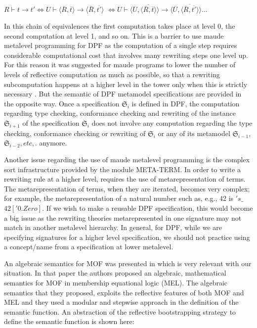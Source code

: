 \documentclass{eceasst}
\begin{document}
\begin{center}
$R \vdash t \rightarrow t' \Leftrightarrow U \vdash \langle \overline{R}, \overline{t} \rangle \rightarrow \langle \overline{R}, \overline{t'} \rangle $
 $\Leftrightarrow U \vdash \langle \overline{U}, \overline{ \langle \overline{R}, \overline{t} \rangle } \rangle \rightarrow \langle \overline{U}, \overline{\langle \overline{R}, \overline{t'} \rangle } \rangle  ...$
\end{center}

In this chain of equivalences the first computation takes place at level 0, the second computation at level 1, and so on. 
This is a barrier to use maude metalevel programming for DPF as the computation of a single step requires considerable computational cost that involves many rewriting steps one level up. 
For this reason it was suggested for maude programs to lower the number of levels of reflective computation as much as possible, so that a rewriting 
subcomputation happens at a higher level in the tower only when this is strictly necessary \cite{Clavel2007}.
But the semantic of DPF metamodel specifications are provided in the opposite way. 
Once a specification $\mathfrak{S}_i$ is defined in DPF, the computation regarding type checking, conformance checking and rewriting of 
the instance $\mathfrak{S}_{i+1}$ of the specification $\mathfrak{S}_i$ does not involve any computation regarding the type checking, conformance checking or rewriting of 
$\mathfrak{S}_i$ or any of its metamodel $\mathfrak{S}_{i-1},$ $\mathfrak{S}_{i-2}, etc,.$ anymore. 

Another issue regarding the use of maude metalevel programming is the complex sort infrastructure provided by the module META-TERM. 
In order to write a rewriting rule at a higher level, requires the use of metarepresentation of terms. 
The metarepresentation of terms, when they are iterated, becomes very complex; for example, the metarepresentation of a natural number such as, e.g., 42 is $'s\_$ $\hat{}$  $42['0.Zero]$. 
If we wish to make a reusable DPF specification, this would become a big issue as the rewriting theories metarepresented in one signature may not match in another metalevel hierarchy. 
In general, for DPF, while we are specifying signatures for a higher level specification, we should not practice using a concept/name from a specification at lower metalevel. 

An algebraic semantics for MOF was presented in \cite{BoronatM10} which is very relevant with our situation. 
In that paper the authors proposed an algebraic, mathematical semantics for MOF in membership equational logic (MEL).
The algebraic semantics that they proposed, exploits the reflective features of both MOF and MEL and they used a modular and stepwise approach in the definition of the semantic function. 
An abstraction of the reflective bootstrapping strategy to define the semantic function is shown here:
\end{document}
